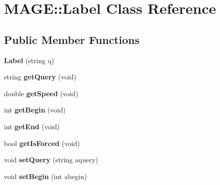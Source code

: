 \hypertarget{class_m_a_g_e_1_1_label}{\section{M\-A\-G\-E\-:\-:Label Class Reference}
\label{class_m_a_g_e_1_1_label}
}
\subsection*{Public Member Functions}
\begin{DoxyCompactItemize}
\item 
\hypertarget{class_m_a_g_e_1_1_label_a52e386d730501d12817be92f89cb2611}{{\bfseries Label} (string q)}\label{class_m_a_g_e_1_1_label_a52e386d730501d12817be92f89cb2611}

\item 
\hypertarget{class_m_a_g_e_1_1_label_a5fb8ca583cd8ec3beed66640785e29d1}{string {\bfseries get\-Query} (void)}\label{class_m_a_g_e_1_1_label_a5fb8ca583cd8ec3beed66640785e29d1}

\item 
\hypertarget{class_m_a_g_e_1_1_label_a4992f435a3ce7b6aea25e09c5fc31e76}{double {\bfseries get\-Speed} (void)}\label{class_m_a_g_e_1_1_label_a4992f435a3ce7b6aea25e09c5fc31e76}

\item 
\hypertarget{class_m_a_g_e_1_1_label_afc10c4c04c795c4139d53a50f4372446}{int {\bfseries get\-Begin} (void)}\label{class_m_a_g_e_1_1_label_afc10c4c04c795c4139d53a50f4372446}

\item 
\hypertarget{class_m_a_g_e_1_1_label_a1ebed98d1be44acec4b76508ad4aabdc}{int {\bfseries get\-End} (void)}\label{class_m_a_g_e_1_1_label_a1ebed98d1be44acec4b76508ad4aabdc}

\item 
\hypertarget{class_m_a_g_e_1_1_label_aec652c9a05431ed75a93c5166d9760c5}{bool {\bfseries get\-Is\-Forced} (void)}\label{class_m_a_g_e_1_1_label_aec652c9a05431ed75a93c5166d9760c5}

\item 
\hypertarget{class_m_a_g_e_1_1_label_a371dc0984e9a505b06ddd6f750ed251a}{void {\bfseries set\-Query} (string aquery)}\label{class_m_a_g_e_1_1_label_a371dc0984e9a505b06ddd6f750ed251a}

\item 
\hypertarget{class_m_a_g_e_1_1_label_a9ac98d6509ab6e758b9660d2a5aa46ed}{void {\bfseries set\-Begin} (int abegin)}\label{class_m_a_g_e_1_1_label_a9ac98d6509ab6e758b9660d2a5aa46ed}


\end{DoxyCompactItemize}
